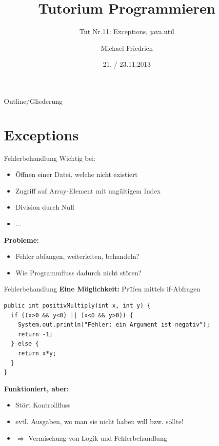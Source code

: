 \documentclass[18pt]{beamer}
\title[Prog Tut Nr. 11]{Tutorium Programmieren}
\subtitle{Tut Nr.11: Exceptions, java.util}
\author{Michael Friedrich}
\date{21. / 23.11.2013}
\institute{Institut f\"ur theoretische Informatik}
\begin{document}

\begin{frame}
	\titlepage
\end{frame}

\begin{frame}{Outline/Gliederung}
  \tableofcontents
\end{frame}

\section{Exceptions}
\begin{frame}{Fehlerbehandlung}
Wichtig bei:
\begin{itemize}
	\item Öffnen einer Datei, welche nicht existiert
  \item Zugriff auf Array-Element mit ungültigem Index
  \item Division durch Null
  \item ...
\end{itemize}
\pause
\textbf{Probleme:}
\begin{itemize}
	\item Fehler abfangen, weiterleiten, behandeln?
  \item Wie Programmfluss dadurch nicht stören?
\end{itemize}
\end{frame}

\begin{frame}[fragile]{Fehlerbehandlung}
	\textbf{Eine Möglichkeit:} Prüfen mittels if-Abfragen
  \begin{lstlisting}
public int positivMultiply(int x, int y) {
  if ((x>0 && y<0) || (x<0 && y>0)) {
    System.out.println("Fehler: ein Argument ist negativ");
    return -1;
  } else {
    return x*y;
  }
}
  \end{lstlisting}
  \pause
  \textbf{Funktioniert, aber:}
  \begin{itemize}
    \item Stört Kontrollfluss
    \item evtl. Ausgaben, wo man sie nicht haben will bzw. sollte!
    \item[] $\Rightarrow$ Vermischung von Logik und Fehlerbehandlung
  \end{itemize}
\end{frame}
\end{document}

